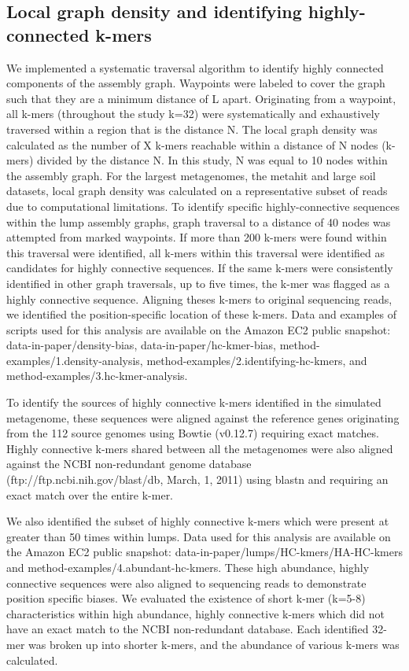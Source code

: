 \documentclass[10pt]{article}
\begin{document}
\subsection*{Local graph density and identifying highly-connected k-mers}
We implemented a systematic traversal algorithm to identify highly connected components of the assembly graph.  Waypoints were labeled to cover the graph such that they are a minimum distance of L apart. Originating from a waypoint, all k-mers (throughout the study k=32) were systematically and exhaustively traversed within a region that is the distance N.  The local graph density was calculated as the number of X k-mers reachable within a distance of N nodes (k-mers) divided by the distance N.  In this study, N was equal to 10 nodes within the assembly graph.  For the largest metagenomes, the metahit and large soil datasets, local graph density was calculated on a representative subset of reads due to computational limitations.  To identify specific highly-connective sequences within the lump assembly graphs, graph traversal to a distance of 40 nodes was attempted from marked waypoints.  If more than 200 k-mers were found within this traversal were identified, all k-mers within this traversal were identified as candidates for highly connective sequences.  If the same k-mers were consistently identified in other graph traversals, up to five times, the k-mer was flagged as a highly connective sequence.  Aligning theses k-mers to original sequencing reads, we identified the position-specific location of these k-mers.  Data and examples of scripts used for this analysis are available on the Amazon EC2 public snapshot: data-in-paper/density-bias, data-in-paper/hc-kmer-bias, method-examples/1.density-analysis, method-examples/2.identifying-hc-kmers, and method-examples/3.hc-kmer-analysis.

To identify the sources of highly connective k-mers identified in the simulated metagenome, these sequences were aligned against the reference genes originating from the 112 source genomes using Bowtie (v0.12.7) requiring exact matches.   Highly connective k-mers shared between all the metagenomes were also aligned against the NCBI non-redundant genome database (ftp://ftp.ncbi.nih.gov/blast/db, March, 1, 2011) using blastn \cite{Altschul:1990p1335} and requiring an exact match over the entire k-mer. 

We also identified the subset of highly connective k-mers which were present at greater than 50 times within lumps. Data used for this analysis are available on the Amazon EC2 public snapshot: data-in-paper/lumps/HC-kmers/HA-HC-kmers and method-examples/4.abundant-hc-kmers. These high abundance, highly connective sequences were also aligned to sequencing reads to demonstrate position specific biases.  We evaluated the existence of short k-mer (k=5-8) characteristics within high abundance, highly connective k-mers which did not have an exact match to the NCBI non-redundant database.  Each identified 32-mer was broken up into shorter k-mers, and the abundance of various k-mers was calculated.
  
\end{document}
